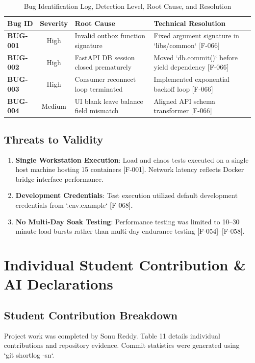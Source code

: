 \documentclass[11pt,a4paper]{article}
\begin{document}
\begin{table}[htbp]
\caption{Bug Identification Log, Detection Level, Root Cause, and Resolution}
\centering
\begin{tabularx}{\linewidth}{l c X X}
\toprule
\textbf{Bug ID} & \textbf{Severity} & \textbf{Root Cause} & \textbf{Technical Resolution} \\
\midrule
\textbf{BUG-001} & High & Invalid outbox function signature & Fixed argument signature in `libs/common` [F-066] \\
\textbf{BUG-002} & High & FastAPI DB session closed prematurely & Moved `db.commit()` before yield dependency [F-066] \\
\textbf{BUG-003} & High & Consumer reconnect loop terminated & Implemented exponential backoff loop [F-066] \\
\textbf{BUG-004} & Medium & UI blank leave balance field mismatch & Aligned API schema transformer [F-066] \\
\bottomrule
\end{tabularx}
\end{table}

\subsection{Threats to Validity}
\begin{enumerate}
    \item \textbf{Single Workstation Execution}: Load and chaos tests executed on a single host machine hosting 15 containers [F-001]. Network latency reflects Docker bridge interface performance.
    \item \textbf{Development Credentials}: Test execution utilized default development credentials from `.env.example` [F-068].
    \item \textbf{No Multi-Day Soak Testing}: Performance testing was limited to 10--30 minute load bursts rather than multi-day endurance testing [F-054]--[F-058].
\end{enumerate}

\section{Individual Student Contribution \& AI Declarations}

\subsection{Student Contribution Breakdown}
Project work was completed by Sonu Reddy. Table 11 details individual contributions and repository evidence. Commit statistics were generated using `git shortlog -sn`.
\end{document}
